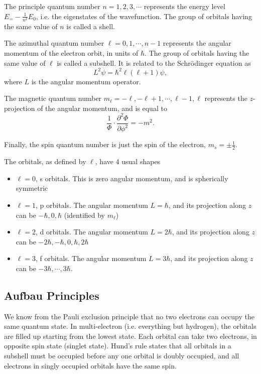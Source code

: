 \documentclass{article}
\begin{document}
The principle quantum number $n=1,2,3,\cdots$ represents the energy level $E_=-\frac{1}{n^2}E_0$, i.e. the eigenstates of the wavefunction. The group of orbitals having the same value of $n$ is called a shell.

The azimuthal quantum number $\ell=0,1,\cdots,n-1$ represents the angular momentum of the electron orbit, in units of $\hbar$. The group of orbitals having the same value of $\ell$ is called a subshell. It is related to the Schr\"odinger equation as 
\[
    L^2\psi =\hbar^2 \ell \left( \ell+1 \right)\psi ,
\]
where $L$ is the angular momentum operator.

The magnetic quantum number $m_{\ell}=-\ell,-\ell+1,\cdots,\ell-1,\ell$ represents the $z$-projection of the angular momentum, and is equal to
\[
    \frac{1}{\Phi}\cdot \frac{\partial^2\Phi}{\partial \phi^2}=-m^2.
\]

Finally, the spin quantum number is just the spin of the electron, $m_s=\pm \frac{1}{2}$.

The orbitals, as defined by $\ell$, have 4 usual shapes
\begin{itemize}
    \item $\ell=0$, s orbitals. This is zero angular momentum, and is spherically symmetric
    \item $\ell=1$, p orbitals. The angular momentum $L=\hbar$, and its projection along $z$ can be $-\hbar,0,\hbar $ (identified by $m_{\ell}$)
    \item $\ell=2$, d orbitals. The angular momentum $L=2 \hbar $, and its projection along $z$ can be $-2 \hbar,-\hbar,0,\hbar,2 \hbar $
    \item $\ell=3$, f orbitals. The angular momentum $L=3 \hbar$, and its projection along $z$ can be $-3 \hbar,\cdots, 3 \hbar $.
\end{itemize}

\subsection{Aufbau Principles}
We know from the Pauli exclusion principle that no two electrons can occupy the same quantum state. In multi-electron (i.e. everything but hydrogen), the orbitals are filled up starting from the lowest state. Each orbital can take two electrons, in opposite spin state (singlet state). Hund's rule states that all orbitals in a subshell must be occupied before any one orbital is doubly occupied, and all electrons in singly occupied orbitals have the same spin.
\end{document}
